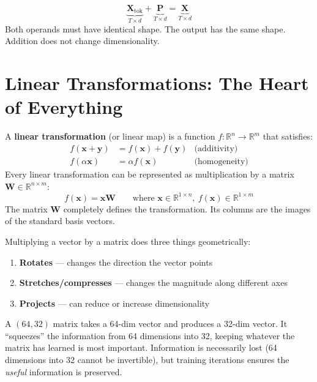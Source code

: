 \documentclass[11pt, a4paper]{article}
\newcommand{\R}{\mathbb{R}}
\newcommand{\vx}{\bm{x}}
\newcommand{\mW}{\bm{W}}
\newcommand{\mX}{\bm{X}}
\newcommand{\mP}{\bm{P}}
\begin{document}
\begin{dimcheck}
\[
\underbrace{\mX_{\text{tok}}}_{T \times d} + \underbrace{\mP}_{T \times d} = \underbrace{\mX}_{T \times d}
\]
Both operands must have identical shape. The output has the same shape.
Addition does not change dimensionality.
\end{dimcheck}

\section{Linear Transformations: The Heart of Everything}

\begin{formaldef}
A \textbf{linear transformation} (or linear map) is a function $f: \R^n \to \R^m$
that satisfies:
\begin{align}
f(\vx + \bm{y}) &= f(\vx) + f(\bm{y}) & \text{(additivity)} \\
f(\alpha \vx) &= \alpha f(\vx) & \text{(homogeneity)}
\end{align}
Every linear transformation can be represented as multiplication by a matrix
$\mW \in \R^{n \times m}$:
\[
f(\vx) = \vx \mW \qquad \text{where } \vx \in \R^{1 \times n}, \ f(\vx) \in \R^{1 \times m}
\]
The matrix $\mW$ completely defines the transformation. Its columns are the images
of the standard basis vectors.
\end{formaldef}

\begin{intuition}
Multiplying a vector by a matrix does three things geometrically:
\begin{enumerate}[nosep]
  \item \textbf{Rotates} --- changes the direction the vector points
  \item \textbf{Stretches/compresses} --- changes the magnitude along different axes
  \item \textbf{Projects} --- can reduce or increase dimensionality
\end{enumerate}
A $(64, 32)$ matrix takes a 64-dim vector and produces a 32-dim vector.
It ``squeezes'' the information from 64 dimensions into 32, keeping whatever
the matrix has learned is most important. Information is necessarily lost
(64 dimensions into 32 cannot be invertible), but training iterations ensures the
\textit{useful} information is preserved.
\end{intuition}
\end{document}
